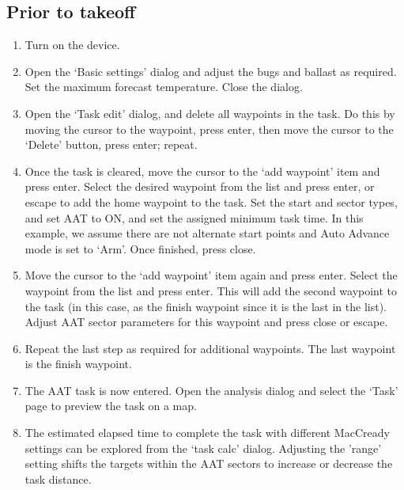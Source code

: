 \documentclass[a4paper,12pt]{refrep}
\begin{document}
\subsection*{Prior to takeoff}
\begin{enumerate}
\item Turn on the device.
\item Open the `Basic settings' dialog and adjust the bugs and ballast as required.  Set the maximum forecast temperature.  Close the dialog.
\item Open the `Task edit' dialog, and delete all waypoints in the task.  Do this by moving the cursor to the waypoint, press enter, then move the cursor to the `Delete' button, press enter; repeat.
\item Once the task is cleared, move the cursor to the `add waypoint' item
and press enter.  Select the desired waypoint from the list and press
enter, or escape to add the home waypoint to the task.  Set the start
and sector types, and set AAT to ON, and set the assigned minimum task
time.  In this example, we assume there are not alternate start points
and Auto Advance mode is set to `Arm'.  Once finished, press close.
\item Move the cursor to the `add waypoint' item again and press enter.  Select the waypoint from the list and press enter.  This will add the second waypoint to the task (in this case, as the finish waypoint since it is the last in the list).  Adjust AAT sector parameters for this waypoint and press close or escape.
\item Repeat the last step as required for additional waypoints.  The last waypoint is the finish waypoint.
\item The AAT task is now entered.  Open the analysis dialog and select the `Task' page to preview the task on a map.
\item The estimated elapsed time to complete the task with different MacCready settings can be explored from the `task calc' dialog.  Adjusting the 'range'
setting shifts the targets within the AAT sectors to increase or
decrease the task distance.
\end{enumerate}
\end{document}
